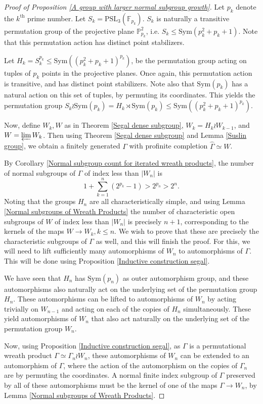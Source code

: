 \documentclass[letterpaper]{amsart}
\begin{document}
\begin{proof}[Proof of Proposition \ref{A group with larger normal subgroup growth}]
Let $p_k$ denote the $k^{\mathrm{th}}$ prime number. Let $S_k = \mathrm{PSL}_3(\mathbb{F}_{p_k})$. $S_k$ is naturally a transitive permutation group of the projective plane $\mathbb{P}^2_{p_k}$, i.e. $S_k \leq \mathrm{Sym}(p_k^2 + p_k + 1).$ Note that this permutation action has distinct point stabilizers.

Let $H_k = S_k^{p_k} \leq \mathrm{Sym}((p_k^2 + p_k + 1)^{p_k})$, be the permutation group acting on tuples of $p_k$ points in the projective planes. Once again, this permutation action is transitive, and has distinct point stabilizers. Note also that $\mathrm{Sym}(p_k)$ has a natural action on this set of tuples, by permuting its coordinates. This yields the permutation group $S_k \wr \mathrm{Sym}(p_k) = H_k \rtimes \mathrm{Sym}(p_k) \leq \mathrm{Sym}((p_k^2 + p_k + 1)^{p_k}).$

Now, define $W_k, W$ as in Theorem \ref{Segal dense subgroup}, $W_k = H_k \wr W_{k-1}$, and $W = \varprojlim W_k$. Then using Theorem \ref{Segal dense subgroup} and Lemma \ref{Suslin group}, we obtain a finitely generated $\Gamma$ with profinite completion $\hat{\Gamma} \simeq W$.

By Corollary \ref{Normal subgroup count for iterated wreath products}, the number of normal subgroups of $\Gamma$ of index less than $|W_n|$ is $$1 + \sum_{k=1}^n (2^{p_k} - 1) > 2^{p_n} > 2^n.$$
Noting that the groups $H_n$ are all characteristically simple, and using Lemma \ref{Normal subgroups of Wreath Products} the number of characteristic open subgroups of $W$ of index less than $|W_n|$ is precisely $n + 1$, corresponding to the kernels of the maps $W \to W_k, k \leq n$. We wish to prove that these are precisely the characteristic subgroups of $\Gamma$ as well, and this will finish the proof. For this, we will need to lift sufficiently many automorphisms of $W_n$ to automorphisms of $\Gamma$. This will be done using Proposition \ref{Inductive construction segal}.

We have seen that $H_n$ has $\mathrm{Sym}(p_n)$ as outer automorphism group, and these automorphisms also naturally act on the underlying set of the permutation group $H_n$. These automorphisms can be lifted to automorphisms of $W_n$ by acting trivially on $W_{n-1}$ and acting on each of the copies of $H_n$ simultaneously. These yield automorphisms of $W_n$ that also act naturally on the underlying set of the permutation group $W_n$.

Now, using Proposition \ref{Inductive construction segal}, as $\Gamma$ is a permutational wreath product $\Gamma \simeq \Gamma_n \wr W_n$, these automorphisms of $W_n$ can be extended to an automorphism of $\Gamma$, where the action of the automorphism on the copies of $\Gamma_n$ are by permuting the coordinates. A normal finite index subgroup of $\Gamma$ preserved by all of these automorphisms must be the kernel of one of the maps $\Gamma \to W_n$, by Lemma \ref{Normal subgroups of Wreath Products}.
\end{proof}
\end{document}
